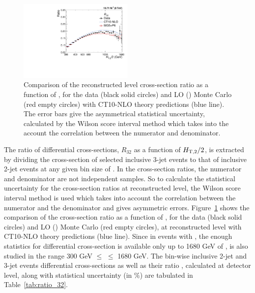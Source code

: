 \begin{figure}[!h] 
 \begin{center}
 \hspace*{-5mm}\includegraphics[width=0.5\textwidth]{Plots_HT_2_150/Ratio_32_all_HT_2_150.pdf}
 \caption[Comparison of the cross-section ratio for the data with simulated events and CT10-NLO theory predictions.]{Comparison of the reconstructed level cross-section ratio \ratio as a function of \httwons, for the data (black solid circles) and LO \MadGraphFn\plusn \PYTHIAS (\MGP) Monte Carlo (red empty circles) with CT10-NLO theory predictions (blue line). The error bars give the asymmetrical statistical uncertainty, calculated by the Wilson score interval method which takes into the account the correlation between the numerator and denominator.}
 \label{fig:ratio_32}
 \end{center}
\end{figure}

The ratio of differential cross-sections, $R_{32}$ as a function of $H_{\mathrm{T,2}}/2$, is extracted by dividing the cross-section of selected inclusive 3-jet events to that of inclusive 2-jet events at any given bin size of \httwo. In the cross-section ratios, the numerator and denominator are not independent samples. So to calculate the statistical uncertainty for the cross-section ratios at reconstructed level, the Wilson score interval method is used which takes into account the correlation between the numerator and the denominator and gives asymmetric errors. Figure~\ref{fig:ratio_32} shows the comparison of the cross-section ratio \ratio as a function of \httwons, for the data (black solid circles) and LO \MadGraphFn\plusn \PYTHIAS (\MGP) Monte Carlo (red empty circles), at reconstructed level with CT10-NLO theory predictions (blue line). Since in events with \njth, the enough statistics for differential cross-section is available only up to 1680 GeV of \httwo, \ratio is also studied in the range 300 GeV $\leq$ \httwo $\leq$ 1680 GeV. The bin-wise inclusive 2-jet and 3-jet events differential cross-sections as well as their ratio \rations, calculated at detector level, along with statistical uncertainty (in \%) are tabulated in Table~\ref{tab:ratio_32}. 

